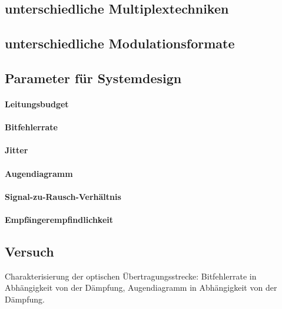 \documentclass[a4paper]{article}
\begin{document}
\subsection{unterschiedliche Multiplextechniken}
\subsection{unterschiedliche Modulationsformate}
\subsection{Parameter für Systemdesign}
\paragraph{Leitungsbudget}
\paragraph{Bitfehlerrate}
\paragraph{Jitter}
\paragraph{Augendiagramm}
\paragraph{Signal-zu-Rausch-Verhältnis}
\paragraph{Empfängerempfindlichkeit}

\subsection{Versuch}
Charakterisierung der optischen Übertragungsstrecke:
Bitfehlerrate in Abhängigkeit von der Dämpfung,
Augendiagramm in Abhängigkeit von der Dämpfung.
\end{document}
